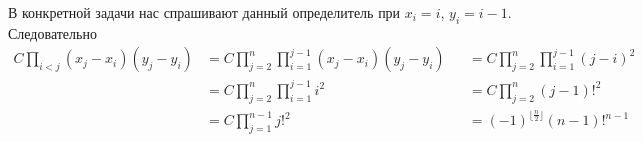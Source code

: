 \documentclass[12pt,a4paper]{article}
\begin{document}
\begin{problem}{2}
        В конкретной задачи нас спрашивают данный определитель при $x_i = i$, $y_i = i-1$. Следовательно
        \begin{align*}
            C\prod_{i < j} (x_j - x_i)(y_j - y_i)
            &= C \prod_{j=2}^n \prod_{i=1}^{j-1} (x_j - x_i)(y_j - y_i)&
            &= C \prod_{j=2}^n \prod_{i=1}^{j-1} (j - i)^2\\
            &= C \prod_{j=2}^n \prod_{i=1}^{j-1} i^2&
            &= C \prod_{j=2}^n (j-1)!^2\\
            &= C \prod_{j=1}^{n-1} j!^2&
            &= \boxed{(-1)^{\lfloor \frac{n}{2} \rfloor} (n-1)!^{n-1}}
        \end{align*}
    \end{problem}
\end{document}
